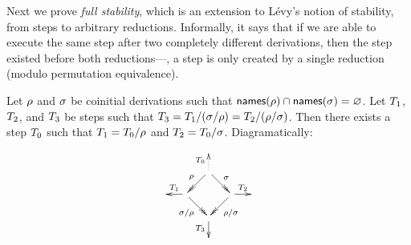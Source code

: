 Next we prove \emph{full stability}, which is an extension to Lévy's notion of
stability, from steps to arbitrary reductions. Informally, it says that if we are able
to execute the same step after two completely different derivations,
then the step existed before
both reductions---\ie, a step is only created by a single reduction (modulo permutation
equivalence).

\begin{lemma}
Let $\rho$ and $\sigma$ be coinitial derivations such that
$\mathsf{names}(\rho) \cap \mathsf{names}(\sigma) = \varnothing$.
Let $T_1$, $T_2$, and $T_3$
be steps such that
$T_3 = T_1/(\sigma/\rho) = T_2/(\rho/\sigma)$.
Then there exists a step $T_0$ such that
$T_1 = T_0/\rho$ and $T_2 = T_0/\sigma$.
Diagramatically:
\[
  \xymatrix@R=.5cm@C=.5cm{
    &&&
  \\
    &
    & \ar@{.>}[u]^{\redexthree_0} \ar@{->>}[ld]_{\redseq} \ar@{->>}[rd]^{\redseqtwo} &
  \\
    &
    \ar[l]_{\redexthree_1}
    \ar@{->>}[rd]_{\redseqtwo/\redseq} & & \ar@{->>}[ld]^{\redseq/\redseqtwo} \ar[r]^{\redexthree_2}
    &
  \\
    &
    &
    \ar[d]_{\redexthree_3}
    &
  \\
    &&&
  }
\]
\end{lemma}
